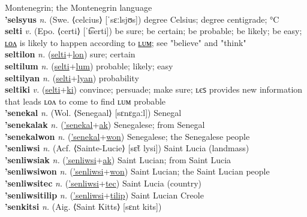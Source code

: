 Montenegrin; the Montenegrin language \label{'selnakolatilip} \\
\textbf{'selsyus} \textit{n.} (Swe. ⟨celcius⟩ [ˈsɛːlsjʊs])
degree Celsius; degree centigrade; °C \label{'selsyus} \\
\textbf{selti} \textit{v.} (Epo. ⟨certi⟩ [ˈt͡serti])
be sure; be certain; be probable; be likely; be easy; \hyperref[seltilon]{ʟᴏᴧ} is likely to happen according to \hyperref[seltilum]{ʟᴜᴍ}; see "believe" and "think" \label{selti} \\
\textbf{seltilon} \textit{n.} (\hyperref[selti]{selti}+\hyperref[lon]{lon})
sure; certain \label{seltilon} \\
\textbf{seltilum} \textit{n.} (\hyperref[selti]{selti}+\hyperref[lum]{lum})
probable; likely; easy \label{seltilum} \\
\textbf{seltilyan} \textit{n.} (\hyperref[selti]{selti}+\hyperref[lyan]{lyan})
probability \label{seltilyan} \\
\textbf{seltiki} \textit{v.} (\hyperref[selti]{selti}+\hyperref[ki]{ki})
convince; persuade; make sure; ʟєꜱ provides new information that leads ʟᴏᴧ to come to find ʟᴜᴍ probable \label{seltiki} \\
\textbf{'senekal} \textit{n.} (Wol. ⟨Senegaal⟩ [sɛnɛgaːl])
Senegal \label{'senekal} \\
\textbf{'senekalak} \textit{n.} (\hyperref['senekal]{'senekal}+\hyperref[ak]{ak})
Senegalese; from Senegal \label{'senekalak} \\
\textbf{'senekalwon} \textit{n.} (\hyperref['senekal]{'senekal}+\hyperref[won]{won})
Senegalese; the Senegalese people \label{'senekalwon} \\
\textbf{'senliwsi} \textit{n.} (Acf. ⟨Sainte-Lucie⟩ [sɛ̃t lysi])
Saint Lucia (landmass) \label{'senliwsi} \\
\textbf{'senliwsiak} \textit{n.} (\hyperref['senliwsi]{'senliwsi}+\hyperref[ak]{ak})
Saint Lucian; from Saint Lucia \label{'senliwsiak} \\
\textbf{'senliwsiwon} \textit{n.} (\hyperref['senliwsi]{'senliwsi}+\hyperref[won]{won})
Saint Lucian; the Saint Lucian people \label{'senliwsiwon} \\
\textbf{'senliwsitec} \textit{n.} (\hyperref['senliwsi]{'senliwsi}+\hyperref[tec]{tec})
Saint Lucia (country) \label{'senliwsitec} \\
\textbf{'senliwsitilip} \textit{n.} (\hyperref['senliwsi]{'senliwsi}+\hyperref[tilip]{tilip})
Saint Lucian Creole \label{'senliwsitilip} \\
\textbf{'senkitsi} \textit{n.} (Aig. ⟨Saint Kitts⟩ [sɛnt kits])
